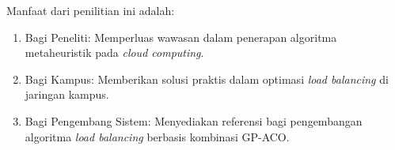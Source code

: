Manfaat dari penilitian ini adalah:

\begin{enumerate}
  \item Bagi Peneliti: Memperluas wawasan dalam penerapan algoritma metaheuristik pada \textit{cloud computing}. 
  \item Bagi Kampus: Memberikan solusi praktis dalam optimasi \textit{load balancing} di jaringan kampus. 
  \item Bagi Pengembang Sistem: Menyediakan referensi bagi pengembangan algoritma \textit{load balancing} berbasis kombinasi GP-ACO.
\end{enumerate}
